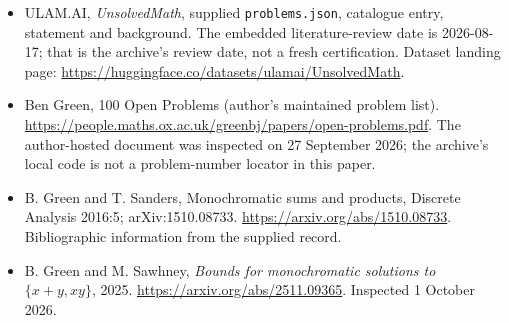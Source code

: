 \documentclass[11pt,a4paper]{article}
\begin{document}
{\small

\begin{itemize}

\item[\hypertarget{source:statement:1}{S1}] ULAM.AI, \emph{UnsolvedMath}, supplied \texttt{problems.json}, catalogue entry, statement and background. The embedded literature-review date is 2026-08-17; that is the archive’s review date, not a fresh certification. Dataset landing page: \url{https://huggingface.co/datasets/ulamai/UnsolvedMath}.

\item[\hypertarget{source:statement:2}{S2}] Ben Green, 100 Open Problems (author’s maintained problem list). \url{https://people.maths.ox.ac.uk/greenbj/papers/open-problems.pdf}. The author-hosted document was inspected on 27 September 2026; the archive’s local code is not a problem-number locator in this paper.

\item[\hypertarget{source:statement:3}{S3}] B. Green and T. Sanders, Monochromatic sums and products, Discrete Analysis 2016:5; arXiv:1510.08733. \url{https://arxiv.org/abs/1510.08733}. Bibliographic information from the supplied record.

\item[E1] B. Green and M. Sawhney, \emph{Bounds for monochromatic solutions to $\{x+y,xy\}$}, 2025. \url{https://arxiv.org/abs/2511.09365}. Inspected 1 October 2026.

\end{itemize}

}

\label{end:statement}
\end{document}
